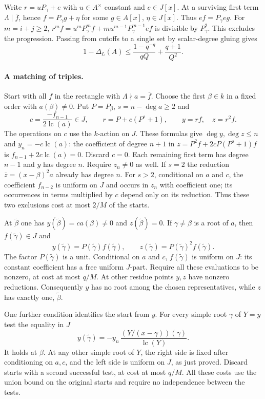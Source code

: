 Write $r=uP_\gamma+e$ with $u\in A^\times$ constant and $e\in J[x]$.
At a surviving first term $\Lambda\mid\overline f$, hence
$f=P_\gamma g+\eta$ for some $g\in A[x]$, $\eta\in J[x]$.
Thus $ef=P_\gamma eg$. For $m=i+j\ge2$,
$r^mf=u^mP_\gamma^mf+mu^{m-1}P_\gamma^{m-1}ef$ is
divisible by $P_\gamma^2$. This excludes the progression.
Passing from cutoffs to a single set by scalar-degree gluing gives
\[
 1-\Delta_L(A)\le\frac{1-q^{-q}}{qQ}+\frac{q+1}{Q^2}.
\]

\paragraph{A matching of triples.}
Start with all $f$ in the rectangle with $\Lambda\nmid a=\overline f$.
Choose the first $\beta\in k$ in a fixed order with $a(\beta)\ne0$.
Put $P=P_\beta$, $s=n-\deg a\ge2$ and
\[
 c=\frac{-f_{n-1}}{2\operatorname{lc}(a)}\in J,\qquad
 r=P+c(P^s+1),\qquad y=rf,\quad z=r^2f .
\]
The operations on $c$ use the $k$-action on $J$. These formulas give
$\deg y,\deg z\le n$ and $y_n=-c\operatorname{lc}(a)$: the coefficient
of degree $n+1$ in $z=P^2f+2cP(P^s+1)f$ is
$f_{n-1}+2c\operatorname{lc}(a)=0$.
Discard $c=0$. Each remaining first term has degree $n-1$ and $y$ has
degree $n$. Require $z_n\ne0$ as well. If $s=2$ the reduction
$\overline z=(x-\beta)^2 a$ already has degree $n$. For $s>2$,
conditional on $a$ and $c$, the coefficient $f_{n-2}$ is uniform on
$J$ and occurs in $z_n$ with coefficient one; its occurrences in terms
multiplied by $c$ depend only on its reduction. Thus these two exclusions
cost at most $2/M$ of the starts.

At $\widetilde\beta$ one has $y(\widetilde\beta)=c a(\beta)\ne0$ and
$z(\widetilde\beta)=0$. If $\gamma\ne\beta$ is a root of $a$,
then $f(\widetilde\gamma)\in J$ and
\[
 y(\widetilde\gamma)=P(\widetilde\gamma)f(\widetilde\gamma),\qquad
 z(\widetilde\gamma)=P(\widetilde\gamma)^2f(\widetilde\gamma).
\]
The factor $P(\widetilde\gamma)$ is a unit. Conditional on $a$ and $c$,
$f(\widetilde\gamma)$ is uniform on $J$: its constant coefficient has
a free uniform $J$-part. Require all these evaluations to be nonzero,
at cost at most $q/M$. At other residue points $y,z$ have nonzero
reductions. Consequently $y$ has no root among the chosen representatives,
while $z$ has exactly one, $\widetilde\beta$.

One further condition identifies the start from $y$. For every simple root
$\gamma$ of $Y=\overline y$ test the equality in $J$
\[
 y(\widetilde\gamma)=
       -y_n\,\frac{(Y/(x-\gamma))(\gamma)}{\operatorname{lc}(Y)} .
\]
It holds at $\beta$. At any other simple root of $Y$, the right side is
fixed after conditioning on $a,c$, and the left side is uniform on
$J$, as just proved. Discard starts with a second successful test,
at cost at most $q/M$. All these costs use the union bound on the
original starts and require no independence between the tests.

